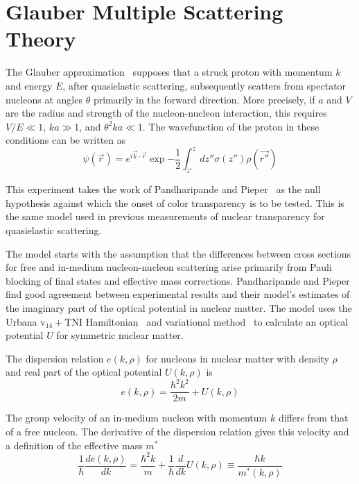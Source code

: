 \section{Glauber Multiple Scattering Theory}
The Glauber approximation~\cite{Glauber_1959} supposes that a struck proton
with momentum $k$ and energy $E$, after quasielastic scattering, subsequently
scatters from spectator nucleons at angles $\theta$ primarily in the
forward direction.
More precisely, if $a$ and $V$ are the radius and strength of the
nucleon-nucleon interaction, this requires
$V/E \ll 1$,
$ka \gg 1$,
and
$\theta^2 k a \ll 1$.
The wavefunction of the proton in these conditions can be written as
\begin{equation}
    \psi(\vec{r}) = e^{i\vec{k}\cdot\vec{r}}
            \exp{ -\frac{1}{2} \int_{z'}^{z} dz'' \sigma(z'') \rho(\vec{r''}) }
\end{equation}


This experiment takes the work of Pandharipande and
Pieper~\cite{Pandharipande_1992} as the null hypothesis against which the onset
of color transparency is to be tested.
This is the same model used in previous measurements of nuclear transparency
for quasielastic scattering. %


The model starts with the assumption that the differences between cross
sections for free and in-medium nucleon-nucleon scattering arise primarily from
Pauli blocking of final states and effective mass corrections.
Pandharipande and Pieper find good agreement between experimental results and
their model's estimates of the imaginary part of the optical potential in
nuclear matter.
The model uses the
Urbana $\text{v}_{14}+\text{TNI}$ Hamiltonian~\cite{Lagaris_1981_331, Lagaris_1981_349}
and variational method~\cite{Wiringa_1988, Friedman_1981}
to calculate an optical potential $U$ for symmetric nuclear matter.


The dispersion relation $e(k,\rho)$ for nucleons in nuclear matter with density
$\rho$ and real part of the optical potential $U(k,\rho)$ is
\begin{equation}
    e(k,\rho) = \frac{\hbar^2 k^2}{2m} + U(k,\rho)
\end{equation}

The group velocity of an in-medium nucleon with momentum $k$ differs from that of a
free nucleon.
The derivative of the dispersion relation gives this velocity and a
definition of the effective mass $m^*$
\begin{equation}
    \frac{1}{\hbar}\frac{de(k,\rho)}{dk}
        = \frac{\hbar^2 k}{m} + \frac{1}{\hbar}\frac{d}{dk}U(k,\rho)
        \equiv \frac{\hbar k}{m^*(k,\rho)}
\end{equation}

